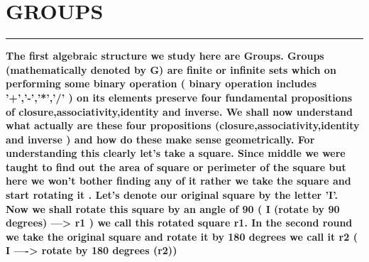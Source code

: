 \documentclass{article}
\begin{document}
\section * {GROUPS}
\hrule 
\bigskip
\textbf{ The first algebraic structure we study here are Groups. Groups (mathematically denoted by G) are finite or infinite sets which on performing some binary operation ( binary operation includes '+','-','*','/' ) on its elements preserve four fundamental propositions of closure,associativity,identity and inverse. We shall now understand what actually are these four propositions (closure,associativity,identity and inverse ) and how do these make sense geometrically.
For understanding this clearly let's take a square. Since middle we were taught to find out the area of square or perimeter of the square but here we won't bother finding any of it rather we take the square and start rotating it . Let's denote our original square by the letter 'I'. Now we shall rotate this square by an angle of 90 ( I (rotate by 90 degrees) ---> r1 ) we call this rotated square r1. In the second round we take the original square and rotate it by 180 degrees we call it r2 ( I ----> rotate by 180 degrees (r2)) 
}
\\
\\
\\
\pagebreak
\end{document}

